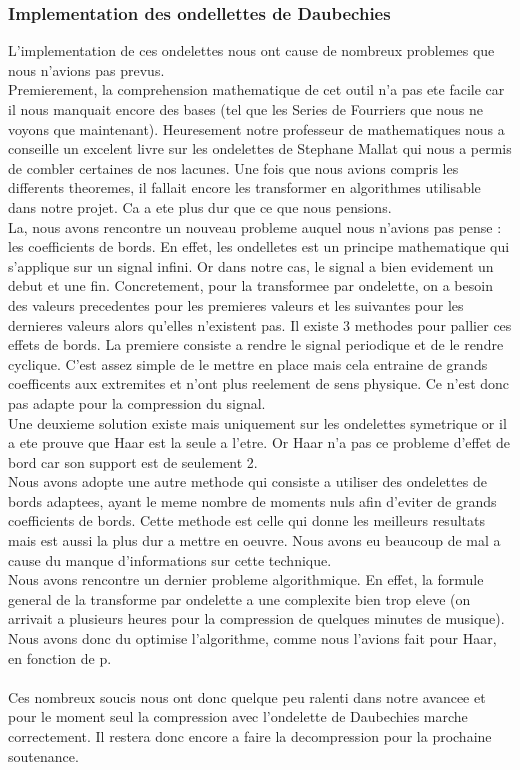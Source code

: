 \documentclass[a4paper,12pt]{article}
\begin{document}
\subsubsection{Implementation des ondellettes de Daubechies}
L'implementation de ces ondelettes nous ont cause de nombreux
problemes que nous n'avions pas prevus.\\
Premierement, la comprehension mathematique de cet outil n'a pas ete
facile car il nous manquait encore des bases (tel que les Series de
Fourriers que nous ne voyons que maintenant). Heuresement notre
professeur de mathematiques nous a conseille un excelent livre sur les
ondelettes de Stephane Mallat qui nous a permis de combler certaines
de nos lacunes. Une fois que nous avions compris les differents
theoremes, il fallait encore les transformer en algorithmes utilisable
dans notre projet. Ca a ete plus dur que ce que nous pensions.\\
La, nous avons rencontre un nouveau probleme auquel nous n'avions pas
pense : les coefficients de bords. En effet, les ondelletes est un
principe mathematique qui s'applique sur un signal infini. Or dans
notre cas, le signal a bien evidement un debut et une
fin. Concretement, pour la transformee par ondelette, on a besoin des
valeurs precedentes pour les premieres valeurs et les suivantes pour
les dernieres valeurs alors qu'elles n'existent pas. Il existe 3
methodes pour pallier ces effets de bords. La premiere consiste a
rendre le signal periodique et de le rendre cyclique. C'est assez
simple de le mettre en place mais cela entraine de grands coefficents
aux extremites et n'ont plus reelement de sens physique. Ce n'est donc
pas adapte pour la compression du signal.\\
Une deuxieme solution existe mais uniquement sur les ondelettes
symetrique or il a ete prouve que Haar est la seule a l'etre. Or Haar
n'a pas ce probleme d'effet de bord car son support est de seulement
2.\\
Nous avons adopte une autre methode qui consiste a utiliser des
ondelettes de bords adaptees, ayant le meme nombre de moments nuls
afin d'eviter de grands coefficients de bords. Cette methode est celle
qui donne les meilleurs resultats mais est aussi la plus dur a mettre
en oeuvre. Nous avons eu beaucoup de mal a cause du manque
d'informations sur cette technique.\\
Nous avons rencontre un dernier probleme algorithmique. En effet, la
formule general de la transforme par ondelette a une complexite bien
trop eleve (on arrivait a plusieurs heures pour la compression de
quelques minutes de musique). Nous avons donc du optimise
l'algorithme, comme nous l'avions fait pour Haar, en fonction de
p.\\\\
Ces nombreux soucis nous ont donc quelque peu ralenti dans notre
avancee et pour le moment seul la compression avec l'ondelette de
Daubechies marche correctement. Il restera donc encore a faire la
decompression pour la prochaine soutenance.
\end{document}
